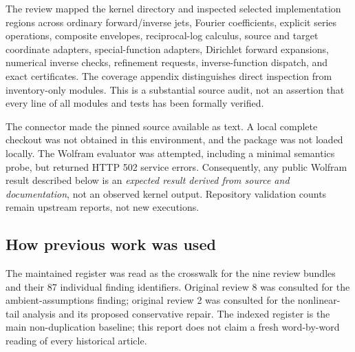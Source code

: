 \documentclass[11pt,a4paper]{article}
\newcommand{\code}[1]{\texttt{\detokenize{#1}}}
\begin{document}
The review mapped the kernel directory and inspected selected implementation regions across ordinary forward/inverse jets, Fourier coefficients, explicit series operations, composite envelopes, reciprocal-log calculus, source and target coordinate adapters, special-function adapters, Dirichlet forward expansions, numerical inverse checks, refinement requests, inverse-function dispatch, and exact certificates. The coverage appendix distinguishes direct inspection from inventory-only modules. This is a substantial source audit, not an assertion that every line of all modules and tests has been formally verified.

The connector made the pinned source available as text. A local complete checkout was not obtained in this environment, and the package was not loaded locally. The Wolfram evaluator was attempted, including a minimal \code{Refine} semantics probe, but returned HTTP 502 service errors. Consequently, any public Wolfram result described below is an \emph{expected result derived from source and documentation}, not an observed kernel output. Repository validation counts remain upstream reports, not new executions.

\subsection{How previous work was used}
The maintained \code{CODE_REVIEW_STATUS.md} register was read as the crosswalk for the nine review bundles and their 87 individual finding identifiers. Original review 8 was consulted for the ambient-assumptions finding; original review 2 was consulted for the nonlinear-tail analysis and its proposed conservative repair. The indexed register is the main non-duplication baseline; this report does not claim a fresh word-by-word reading of every historical article.\cite{status,r8,r8ledger,r2}
\end{document}

